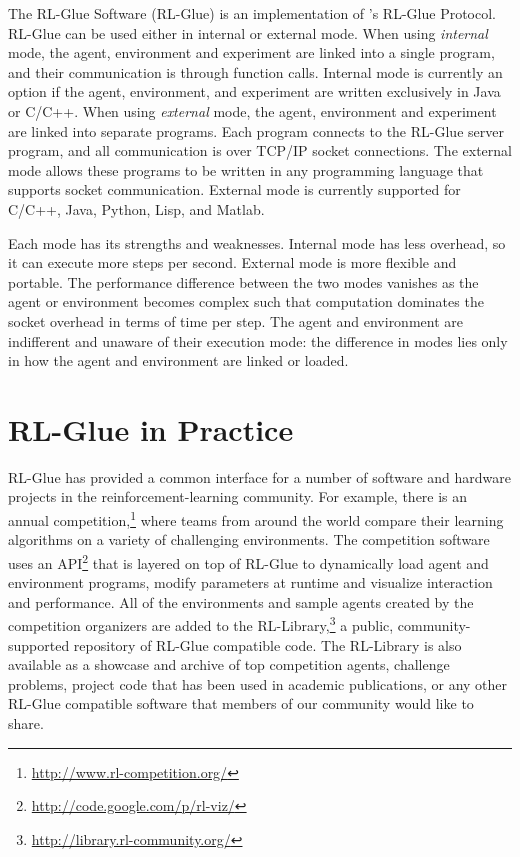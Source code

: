 \documentclass[twoside,11pt]{article}
\begin{document}
The RL-Glue Software (RL-Glue) is an implementation of \citeauthor{whiteThesis}'s RL-Glue Protocol.  RL-Glue can be used either in  internal or external mode.  When using \textit{internal} mode, the agent, environment and experiment are linked into a single program, and their communication is through function calls.  Internal mode is currently an option if the agent, environment, and experiment are written exclusively in Java or C/C++.  When using  \textit{external} mode, the agent, environment and experiment are linked into separate programs.  Each program connects to the RL-Glue server program, and all communication is over TCP/IP socket connections. The external mode allows these programs to be written in any programming language that supports socket communication.  External mode is currently supported for C/C++, Java, Python, Lisp, and Matlab.

Each mode has its strengths and weaknesses. Internal mode has less overhead, so it can execute more steps per second. External mode is more flexible and portable.  The performance difference between the two modes vanishes as the agent or environment becomes complex such that computation dominates the socket overhead in terms of time per step.  The agent and environment are indifferent and unaware of their execution mode: the difference in modes lies only in how the agent and environment are linked or loaded.

\section{RL-Glue in Practice}
RL-Glue has provided a common interface for a number of software and hardware projects in the reinforcement-learning community.  For example, there is an annual competition,\footnote{\url{http://www.rl-competition.org/}} where teams from around the world compare their learning algorithms on a variety of challenging environments.  The competition software uses an API\footnote{\url{http://code.google.com/p/rl-viz/}} that is layered on top of RL-Glue to dynamically load agent and environment programs, modify parameters at runtime and visualize interaction and performance.  All of the environments and sample agents created by the competition organizers are added to the RL-Library,\footnote{\url{http://library.rl-community.org/}} a public, community-supported repository of RL-Glue compatible code. The RL-Library is also available as a showcase and archive of top competition agents, challenge problems, project code that has been used in academic publications, or any other RL-Glue compatible software that members of our community would like to share.
\end{document}
